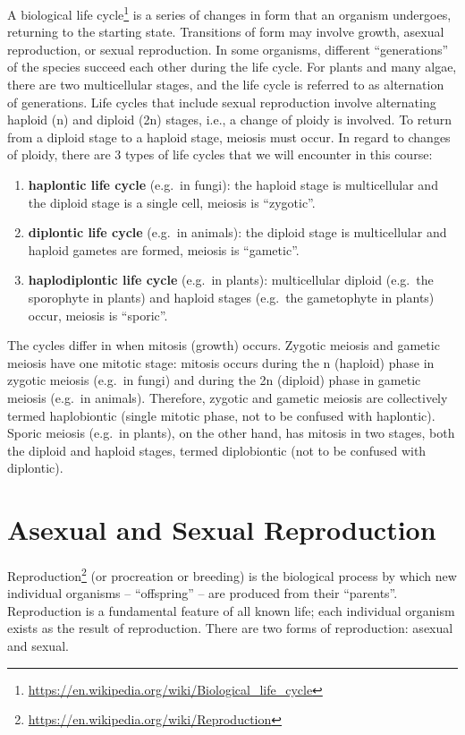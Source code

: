\documentclass[]{book}
\providecommand{\tightlist}{%
  \setlength{\itemsep}{0pt}\setlength{\parskip}{0pt}}
\let\rmarkdownfootnote\footnote%
\def\footnote{\protect\rmarkdownfootnote}
\renewcommand{\href}[2]{#2\footnote{\url{#1}}}
\theoremstyle{definition}
\theoremstyle{definition}
\theoremstyle{definition}
\theoremstyle{remark}
\begin{document}
A \href{https://en.wikipedia.org/wiki/Biological_life_cycle}{biological
life cycle} is a series of changes in form that an organism undergoes,
returning to the starting state. Transitions of form may involve growth,
asexual reproduction, or sexual reproduction. In some organisms,
different ``generations'' of the species succeed each other during the
life cycle. For plants and many algae, there are two multicellular
stages, and the life cycle is referred to as alternation of generations.
Life cycles that include sexual reproduction involve alternating haploid
(n) and diploid (2n) stages, i.e., a change of ploidy is involved. To
return from a diploid stage to a haploid stage, meiosis must occur. In
regard to changes of ploidy, there are 3 types of life cycles that we
will encounter in this course:

\begin{enumerate}
\def\labelenumi{\arabic{enumi}.}
\tightlist
\item
  \textbf{haplontic life cycle} (e.g.~in fungi): the haploid stage is
  multicellular and the diploid stage is a single cell, meiosis is
  ``zygotic''.
\item
  \textbf{diplontic life cycle} (e.g.~in animals): the diploid stage is
  multicellular and haploid gametes are formed, meiosis is ``gametic''.
\item
  \textbf{haplodiplontic life cycle} (e.g.~in plants): multicellular
  diploid (e.g.~the sporophyte in plants) and haploid stages (e.g.~the
  gametophyte in plants) occur, meiosis is ``sporic''.
\end{enumerate}

The cycles differ in when mitosis (growth) occurs. Zygotic meiosis and
gametic meiosis have one mitotic stage: mitosis occurs during the n
(haploid) phase in zygotic meiosis (e.g.~in fungi) and during the 2n
(diploid) phase in gametic meiosis (e.g.~in animals). Therefore, zygotic
and gametic meiosis are collectively termed haplobiontic (single mitotic
phase, not to be confused with haplontic). Sporic meiosis (e.g.~in
plants), on the other hand, has mitosis in two stages, both the diploid
and haploid stages, termed diplobiontic (not to be confused with
diplontic).

\section{Asexual and Sexual
Reproduction}\label{asexual-and-sexual-reproduction}

\href{https://en.wikipedia.org/wiki/Reproduction}{Reproduction} (or
procreation or breeding) is the biological process by which new
individual organisms -- ``offspring'' -- are produced from their
``parents''. Reproduction is a fundamental feature of all known life;
each individual organism exists as the result of reproduction. There are
two forms of reproduction: asexual and sexual.
\end{document}
